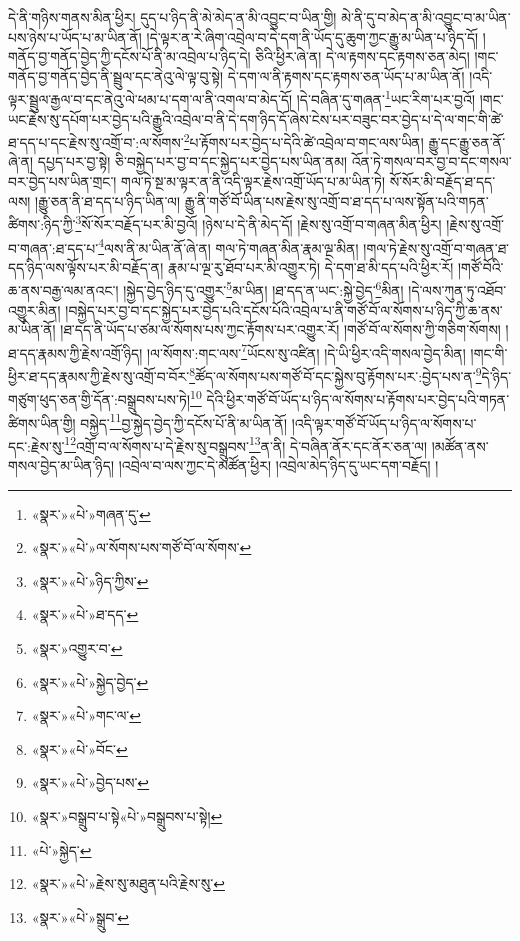 དེ་ནི་གཉིས་གནས་མིན་ཕྱིར། དུད་པ་ཉིད་ནི་མེ་མེད་ན་མི་འབྱུང་བ་ཡིན་གྱི། མེ་ནི་དུ་བ་མེད་ན་མི་འབྱུང་བ་མ་ཡིན་པས་ཉེས་པ་ཡོད་པ་མ་ཡིན་ནོ། །དེ་ལྟར་ན་རེ་ཞིག་འབྲེལ་བ་དེ་དག་ནི་ཡོད་དུ་ཆུག་ཀྱང་རྒྱུ་མ་ཡིན་པ་ཉིད་དོ། །གནོད་བྱ་གནོད་བྱེད་ཀྱི་དངོས་པོ་ནི་མ་འབྲེལ་པ་ཉིད་དེ། ཅིའི་ཕྱིར་ཞེ་ན། དེ་ལ་རྟགས་དང་རྟགས་ཅན་མེད། །གང་གནོད་བྱ་གནོད་བྱེད་ནི་སྦྲུལ་དང་ནེའུ་ལེ་ལྟ་བུ་སྟེ། དེ་དག་ལ་ནི་རྟགས་དང་རྟགས་ཅན་ཡོད་པ་མ་ཡིན་ནོ། །འདི་ལྟར་སྦྲུལ་རྒྱལ་བ་དང་ནེའུ་ལེ་ཕམ་པ་དག་ལ་ནི་འགལ་བ་མེད་དོ། །དེ་བཞིན་དུ་གཞན་\footnote{«སྣར་»«པེ་»གཞན་དུ་}ཡང་རིག་པར་བྱའོ། །གང་ཡང་རྗེས་སུ་དཔོག་པར་བྱེད་པའི་རྒྱུའི་འབྲེལ་བ་ནི་དེ་དག་ཉིད་དོ་ཞེས་ངེས་པར་བཟུང་བར་བྱེད་པ་དེ་ལ་གང་གི་ཚེ་ཐ་དད་པ་དང་རྗེས་སུ་འགྲོ་བ་:ལ་སོགས་\footnote{«སྣར་»«པེ་»ལ་སོགས་པས་གཙོ་བོ་ལ་སོགས་}པ་རྟོགས་པར་བྱེད་པ་དེའི་ཚེ་འབྲེལ་བ་གང་ལས་ཡིན། རྒྱུ་དང་རྒྱུ་ཅན་ནོ་ཞེ་ན། དཔྱད་པར་བྱ་སྟེ། ཅི་བསྐྱེད་པར་བྱ་བ་དང་སྐྱེད་པར་བྱེད་པས་ཡིན་ནམ། འོན་ཏེ་གསལ་བར་བྱ་བ་དང་གསལ་བར་བྱེད་པས་ཡིན་གྲང་། གལ་ཏེ་སྔ་མ་ལྟར་ན་ནི་འདི་ལྟར་རྗེས་འགྲོ་ཡོད་པ་མ་ཡིན་ཏེ། སོ་སོར་མི་བརྗོད་ཐ་དད་ལས། །རྒྱུ་ཅན་ནི་ཐ་དད་པ་ཉིད་ཡིན་ལ། རྒྱུ་ནི་གཙོ་བོ་ཡིན་པས་རྗེས་སུ་འགྲོ་བ་ཐ་དད་པ་ལས་སྟོན་པའི་གཏན་ཚིགས་:ཉིད་ཀྱི་\footnote{«སྣར་»«པེ་»ཉིད་ཀྱིས་}སོ་སོར་བརྗོད་པར་མི་བྱའོ། །ཉེས་པ་དེ་ནི་མེད་དོ། །རྗེས་སུ་འགྲོ་བ་གཞན་མིན་ཕྱིར། །རྗེས་སུ་འགྲོ་བ་གཞན་:ཐ་དད་པ་\footnote{«སྣར་»«པེ་»ཐ་དད་}ལས་ནི་མ་ཡིན་ནོ་ཞེ་ན། གལ་ཏེ་གཞན་མིན་རྣམ་ལྔ་མིན། །གལ་ཏེ་རྗེས་སུ་འགྲོ་བ་གཞན་ཐ་དད་ཉིད་ལས་ལྟོས་པར་མི་བརྗོད་ན། རྣམ་པ་ལྔ་རུ་ཐོབ་པར་མི་འགྱུར་ཏེ། དེ་དག་ཐ་མི་དད་པའི་ཕྱིར་རོ། །གཙོ་བོའི་ཆ་ནས་བརྒྱ་ལམ་ནའང་། །སྐྱེད་བྱེད་ཉིད་དུ་འགྱུར་\footnote{«སྣར་»འགྱུར་བ་}མ་ཡིན། །ཐ་དད་ན་ཡང་:སྐྱེ་བྱེད་\footnote{«སྣར་»«པེ་»སྐྱེད་བྱེད་}མིན། །དེ་ལས་ཀུན་ཏུ་འཐོབ་འགྱུར་མིན། །བསྐྱེད་པར་བྱ་བ་དང་སྐྱེད་པར་བྱེད་པའི་དངོས་པོའི་འབྲེལ་པ་ནི་གཙོ་བོ་ལ་སོགས་པ་ཉིད་ཀྱི་ཆ་ནས་མ་ཡིན་ནོ། །ཐ་དད་ནི་ཡོད་པ་ཙམ་ལ་སོགས་པས་ཀྱང་རྟོགས་པར་འགྱུར་རོ། །གཙོ་བོ་ལ་སོགས་ཀྱི་གཅིག་སོགས། །ཐ་དད་རྣམས་ཀྱི་རྗེས་འགྲོ་ཉིད། །ལ་སོགས་:གང་ལས་\footnote{«སྣར་»«པེ་»གང་ལ་}ཡོངས་སུ་འཛིན། །དེ་ཡི་ཕྱིར་འདི་གསལ་བྱེད་མིན། །གང་གི་ཕྱིར་ཐ་དད་རྣམས་ཀྱི་རྗེས་སུ་འགྲོ་བ་བོར་\footnote{«སྣར་»«པེ་»བོང་}ཚོད་ལ་སོགས་པས་གཙོ་བོ་དང་སྐྱེས་བུ་རྟོགས་པར་:བྱེད་པས་ན་\footnote{«སྣར་»«པེ་»བྱེད་པས་}དེ་ཉིད་གཙུག་ཕུད་ཅན་གྱི་དོན་:བསྒྲུབས་པས་ཏེ།\footnote{«སྣར་»བསྒྲུབ་པ་སྟེ«པེ་»བསྒྲུབས་པ་སྟེ།} དེའི་ཕྱིར་གཙོ་བོ་ཡོད་པ་ཉིད་ལ་སོགས་པ་རྟོགས་པར་བྱེད་པའི་གཏན་ཚིགས་ཡིན་གྱི། བསྐྱེད་\footnote{«པེ་»སྐྱེད་}བྱ་སྐྱེད་བྱེད་ཀྱི་དངོས་པོ་ནི་མ་ཡིན་ནོ། །འདི་ལྟར་གཙོ་བོ་ཡོད་པ་ཉིད་ལ་སོགས་པ་དང་:རྗེས་སུ་\footnote{«སྣར་»«པེ་»རྗེས་སུ་མཐུན་པའི་རྗེས་སུ་}འགྲོ་བ་ལ་སོགས་པ་དེ་རྗེས་སུ་བསྒྲུབས་\footnote{«སྣར་»«པེ་»སྒྲུབ་}ན་ནི། དེ་བཞིན་ནོར་དང་ནོར་ཅན་ལ། །མཚོན་ནས་གསལ་བྱེད་མ་ཡིན་ཉིད། །འབྲེལ་བ་ལས་ཀྱང་དེ་མཚོན་ཕྱིར། །འབྲེལ་མེད་ཉིད་དུ་ཡང་དག་བརྗོད། །
